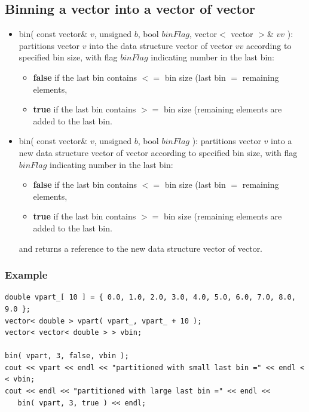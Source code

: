 \documentclass{report}
\begin{document}
\subsection{Binning a vector into a vector of vector}

\begin{itemize}
\item bin( const vector\& $v$, unsigned $b$, bool $binFlag$, vector$<$
      vector $>$\& $vv$ ): partitions vector $v$ into the data
      structure vector of vector $vv$ according to specified bin size,
      with flag $binFlag$ indicating number in the last bin:
\begin{itemize}
\item {\bf false} if the last bin contains $<=$ bin size (last bin $=$
      remaining elements,
\item {\bf true} if the last bin contains $>=$ bin size (remaining
      elements are added to the last bin.
\end{itemize}
\item bin( const vector\& $v$, unsigned $b$, bool $binFlag$ ):
      partitions vector $v$ into a new data structure vector of vector
      according to specified bin size, with flag $binFlag$ indicating
      number in the last bin:
\begin{itemize}
\item {\bf false} if the last bin contains $<=$ bin size (last bin $=$
      remaining elements,
\item {\bf true} if the last bin contains $>=$ bin size (remaining
      elements are added to the last bin.
\end{itemize}
and returns a reference to the new data structure vector of vector.
\end{itemize}

\subsubsection{Example}

\begin{verbatim}
double vpart_[ 10 ] = { 0.0, 1.0, 2.0, 3.0, 4.0, 5.0, 6.0, 7.0, 8.0,
9.0 };
vector< double > vpart( vpart_, vpart_ + 10 );
vector< vector< double > > vbin;

bin( vpart, 3, false, vbin );
cout << vpart << endl << "partitioned with small last bin =" << endl <
< vbin;
cout << endl << "partitioned with large last bin =" << endl <<
   bin( vpart, 3, true ) << endl;
\end{verbatim}
\end{document}
